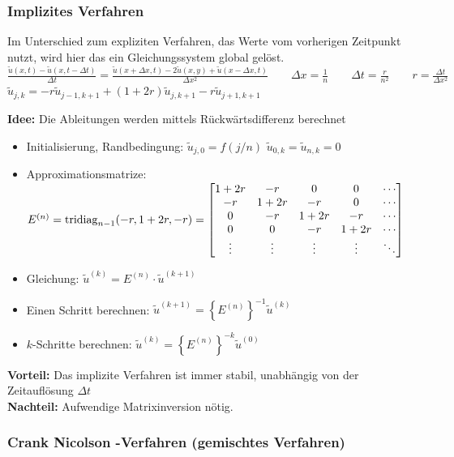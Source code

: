 \subsubsection{Implizites Verfahren}
Im Unterschied zum expliziten Verfahren, das Werte vom vorherigen Zeitpunkt nutzt, wird hier das ein Gleichungssystem global gelöst.\\

$\boxed{\frac{\tilde{u}(x,t) - \tilde{u}(x,t -\Delta t)}{\Delta t} = 
\frac{\tilde{u}(x+\Delta x, t)-2\tilde{u}(x,y) + \tilde{u}( x - \Delta x, t )} {\Delta x^2}}
 \qquad \Delta x=\frac{1}{n} \qquad \Delta t=\frac{r}{n^2} \qquad \boxed{r=\frac{\Delta
t}{\Delta x^2}}$\\

$ \tilde{u}_{j,k} = - r \tilde{u}_{j-1,k+1} + (1+2r)\tilde{u}_{j,k+1} - r \tilde{u}_{j+1,k+1}$

\textbf{Idee:} Die Ableitungen werden mittels Rückwärtsdifferenz berechnet\\


\begin{itemize}
\item Initialisierung, Randbedingung: $\tilde{u}_{j,0}=f(j/n)$ \qquad $\tilde{u}_{0,k}=\tilde{u}_{n,k}=0$
\item Approximationsmatrize: $E^{(n)}=\operatorname{tridiag}_{n-1}(-r,1+2r,-r)=\begin{bmatrix}
1+2r& -r		& 0		& 0 	&\cdots\\
-r	& 1+2r  & -r		& 0		&\cdots\\
0	& -r		& 1+2r 	& -r 	&\cdots\\
0	& 0		& -r		& 1+2r 	&\cdots\\
\vdots&	\vdots&\vdots&\vdots&\ddots	
\end{bmatrix}$
\item Gleichung: $\tilde{u}^{(k)}=E^{(n)} \cdot \tilde{u}^{(k + 1)}$
\item Einen Schritt berechnen: $\tilde{u}^{(k+1)}=\left\{E^{(n)}\right\}^{-1} \tilde{u}^{(k)}$
\item $k$-Schritte berechnen: $\tilde{u}^{(k)}=\left\{E^{(n)}\right\}^{\bm{-}k} \tilde{u}^{(0)}$
\end{itemize}

\textbf{Vorteil:} Das implizite Verfahren ist immer stabil, unabhängig von der Zeitauflösung $\Delta t$\\
\textbf{Nachteil:} Aufwendige Matrixinversion nötig.

\subsubsection{Crank Nicolson -Verfahren (gemischtes Verfahren)}

